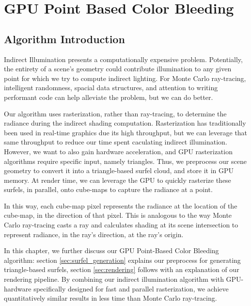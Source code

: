 \chapter{GPU Point Based Color Bleeding}

\section{Algorithm Introduction}

Indirect Illumination presents a computationally expensive problem. Potentially, the entirety of a scene's geometry could contribute illumination to any given point for which we try to compute indirect lighting. For Monte Carlo ray-tracing, intelligent randomness, spacial data structures, and attention to writing performant code can help alleviate the problem, but we can do better.

Our algorithm uses rasterization, rather than ray-tracing, to determine the radiance during the indirect shading computation. Rasterization has traditionally been used in real-time graphics due its high throughput, but we can leverage that same throughput to reduce our time spent caculating indirect illumination. However, we want to also gain hardware acceleration, and GPU rasterization algorithms require specific input, namely triangles. Thus, we preprocess our scene geometry to convert it into a triangle-based surfel cloud, and store it in GPU memory. At render time, we can leverage the GPU to quickly rasterize these surfels, in parallel, onto cube-maps to capture the radiance at a point.

In this way, each cube-map pixel represents the radiance at the location of the cube-map, in the direction of that pixel. This is analogous to the way Monte Carlo ray-tracing casts a ray and calculates shading at its scene intersection to represent radiance, in the ray's direction, at the ray's origin.

In this chapter, we further discuss our GPU Point-Based Color Bleeding algorithm: section \ref{sec:surfel_generation} explains our preprocess for generating triangle-based surfels, section \ref{sec:rendering} follows with an explanation of our rendering pipeline. By combining our indirect illumination algorithm with GPU-hardware specifically designed for fast and parallel rasterization, we achieve quantitatively similar results in less time than Monte Carlo ray-tracing.

